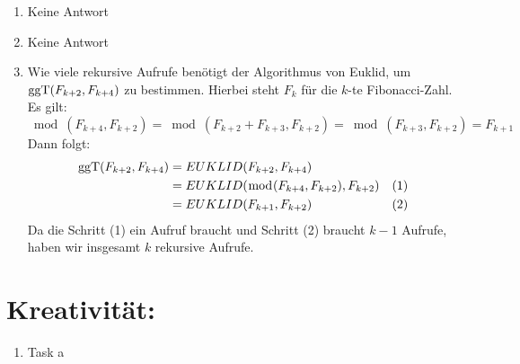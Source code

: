 \begin{enumerate}[label=(\alph*)]
        \item Keine Antwort
        
        \item Keine Antwort
        
        \item Wie viele rekursive Aufrufe benötigt der Algorithmus von Euklid, um $\operatorname{ggT}(F_{k+2},F_{k+4})$
		zu bestimmen. Hierbei steht $F_k$ für die $k$-te Fibonacci-Zahl.
		Es gilt:
		\[\bmod(F_{k+4},F_{k+2}) = \bmod(F_{k+2} + F_{k+3},F_{k+2}) = \bmod(F_{k+3},F_{k+2}) = F_{k+1}\]
		Dann folgt:
		\begin{align*}
			\operatorname{ggT}(F_{k+2},F_{k+4}) &= EUKLID(F_{k+2},F_{k+4}) \\
			 &= EUKLID(\bmod(F_{k+4},F_{k+2}),F_{k+2}) &(1) \\ 
			 &= EUKLID(F_{k+1},F_{k+2}) &(2)
		\end{align*}
		Da die Schritt (1) ein Aufruf braucht und Schritt (2) braucht $k-1$ Aufrufe, haben wir insgesamt
		$k$ rekursive Aufrufe.

    \end{enumerate}
    \section*{Kreativität:}
    \begin{enumerate}[label=(\alph*)]
    	\item Task a
    \end{enumerate}
